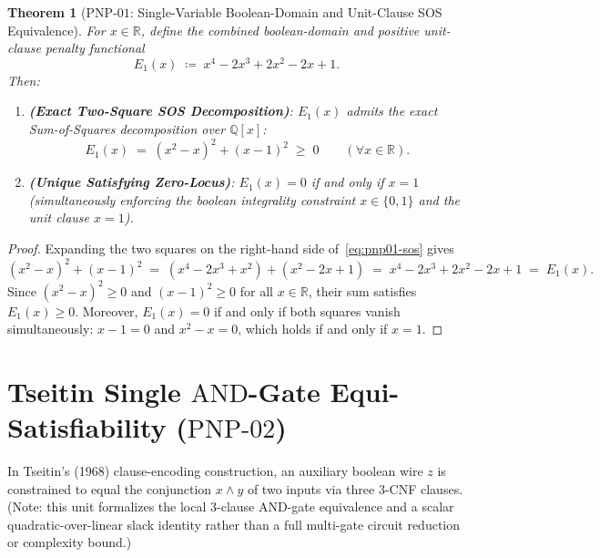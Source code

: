 \documentclass[11pt,a4paper]{article}
\theoremstyle{plain}
\newtheorem{theorem}{Theorem}[section]
\theoremstyle{definition}
\theoremstyle{remark}
\newcommand{\R}{\mathbb{R}}
\newcommand{\Q}{\mathbb{Q}}
\begin{document}
\begin{theorem}[$\mathrm{PNP\text{-}01}$: Single-Variable Boolean-Domain and Unit-Clause SOS Equivalence]\label{thm:pnp01}
For $x \in \R$, define the combined boolean-domain and positive unit-clause penalty functional
\begin{equation}
  E_1(x) \;\coloneqq\; x^4 - 2x^3 + 2x^2 - 2x + 1.
\end{equation}
Then:
\begin{enumerate}
  \item \textbf{(Exact Two-Square SOS Decomposition)}: $E_1(x)$ admits the exact Sum-of-Squares decomposition over $\Q[x]$:
  \begin{equation}\label{eq:pnp01-sos}
    E_1(x) \;=\; (x^2 - x)^2 + (x - 1)^2 \;\ge\; 0 \qquad (\forall x \in \R).
  \end{equation}
  \item \textbf{(Unique Satisfying Zero-Locus)}: $E_1(x) = 0$ if and only if $x = 1$ (simultaneously enforcing the boolean integrality constraint $x \in \{0, 1\}$ and the unit clause $x = 1$).
\end{enumerate}
\end{theorem}

\begin{proof}
Expanding the two squares on the right-hand side of~\eqref{eq:pnp01-sos} gives
\[
  (x^2 - x)^2 + (x - 1)^2 \;=\; (x^4 - 2x^3 + x^2) + (x^2 - 2x + 1) \;=\; x^4 - 2x^3 + 2x^2 - 2x + 1 \;=\; E_1(x).
\]
Since $(x^2 - x)^2 \ge 0$ and $(x - 1)^2 \ge 0$ for all $x \in \R$, their sum satisfies $E_1(x) \ge 0$. Moreover, $E_1(x) = 0$ if and only if both squares vanish simultaneously: $x - 1 = 0$ and $x^2 - x = 0$, which holds if and only if $x = 1$.
\end{proof}

\section{Tseitin Single \texorpdfstring{$\mathrm{AND}$}{AND}-Gate Equi-Satisfiability (\texorpdfstring{$\mathrm{PNP\text{-}02}$}{PNP-02})}

In Tseitin's (1968) clause-encoding construction, an auxiliary boolean wire $z$ is constrained to equal the conjunction $x \land y$ of two inputs via three 3-CNF clauses. (Note: this unit formalizes the local 3-clause $\mathrm{AND}$-gate equivalence and a scalar quadratic-over-linear slack identity rather than a full multi-gate circuit reduction or complexity bound.)
\end{document}
